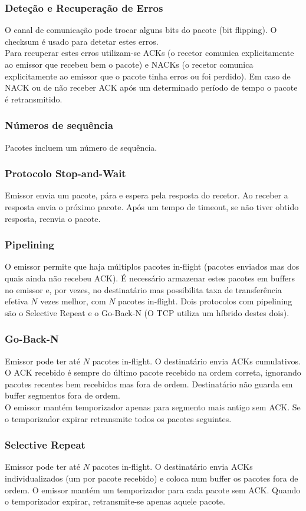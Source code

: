 \documentclass[10pt,a4paper]{report}
\begin{document}
\subsubsection{Deteção e Recuperação de Erros}
O canal de comunicação pode trocar alguns bits do pacote (bit flipping). O checksum é usado para detetar estes erros.\\
Para recuperar estes erros utilizam-se ACKs (o recetor comunica
explicitamente ao emissor que recebeu bem o pacote) e NACKs (o recetor
comunica explicitamente ao emissor que o pacote tinha
erros ou foi perdido).
Em caso de NACK ou de não receber ACK após um determinado período de tempo o pacote é retransmitido.
\subsubsection{Números de sequência}
Pacotes incluem um número de sequência.
\subsubsection{Protocolo Stop-and-Wait}
Emissor envia um pacote, pára e espera pela resposta do recetor. Ao receber a resposta envia o próximo pacote. Após um tempo de timeout, se não tiver obtido resposta, reenvia o pacote.
\subsubsection{Pipelining}
O emissor permite que haja múltiplos pacotes in-flight (pacotes enviados mas dos quais ainda não recebeu ACK). É necessário armazenar estes pacotes em buffers no emissor e, por vezes, no destinatário mas possibilita taxa de transferência efetiva $N$ vezes melhor, com $N$ pacotes in-flight. Dois protocolos com pipelining são o Selective Repeat e o Go-Back-N (O TCP utiliza um híbrido destes dois).
\subsubsection{Go-Back-N}
Emissor pode ter até $N$ pacotes in-flight. O destinatário envia ACKs cumulativos. O ACK recebido é sempre do último pacote recebido na ordem correta, ignorando pacotes recentes bem recebidos mas fora de ordem. Destinatário não guarda em buffer segmentos fora de ordem.\\
O emissor mantém temporizador apenas para segmento mais antigo sem ACK. Se o temporizador expirar retransmite todos os pacotes seguintes.
\subsubsection{Selective Repeat}
Emissor pode ter até $N$ pacotes in-flight. O destinatário envia ACKs individualizados (um
por pacote recebido) e coloca num buffer os pacotes fora de ordem. O emissor mantém um temporizador para cada pacote sem ACK. Quando o temporizador expirar, retransmite-se apenas aquele pacote.
\clearpage
\end{document}
